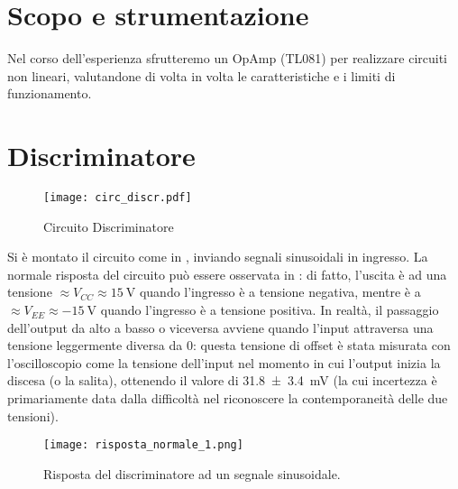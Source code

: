 \section{Scopo e strumentazione}

Nel corso dell'esperienza sfrutteremo un OpAmp (TL081) per realizzare circuiti non lineari, valutandone di volta in volta le caratteristiche e i limiti di funzionamento.

\section{Discriminatore}

\begin{figure}[h]
	\centering
	\texttt{[image: circ\_discr.pdf]}
	\caption{Circuito Discriminatore}
	\label{f:discr}
\end{figure}

Si è montato il circuito come in , inviando segnali sinusoidali in ingresso. La normale risposta del circuito può essere osservata in : di fatto, l'uscita è ad una tensione $\approx V_{CC} \approx \SI{15}{\V}$ quando l'ingresso è a tensione negativa, mentre è a $\approx V_{EE} \approx \SI{-15}{\V}$ quando l'ingresso è a tensione positiva. In realtà, il passaggio dell'output da alto a basso o viceversa avviene quando l'input attraversa una tensione leggermente diversa da 0: questa tensione di offset è stata misurata con l'oscilloscopio come la tensione dell'input nel momento in cui l'output inizia la discesa (o la salita), ottenendo il valore di \SI{31.8(34)}{\mV} (la cui incertezza è primariamente data dalla difficoltà nel riconoscere la contemporaneità delle due tensioni).

\begin{figure}
	\centering
	\texttt{[image: risposta\_normale\_1.png]}
	\caption{Risposta del discriminatore ad un segnale sinusoidale.}
	\label{f:discr_normale}
\end{figure}

